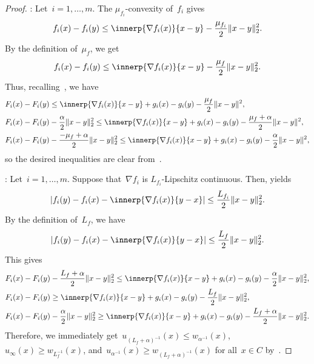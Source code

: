\documentclass[../main]{subfiles}
\begin{document}
\begin{proof}
    :
Let~$i = 1, \dots, m$.
The $\mu_{f_i}$-convexity of~$f_i$ gives
\begin{equation}
    f_i(x) - f_i(y) \le \innerp{\nabla f_i(x)}{x - y} - \frac{\mu_{f_i}}{2} \norm{x - y}_2^2
.\end{equation}
By the definition of~$\mu_f$, we get
\begin{equation}
    f_i(x) - f_i(y) \le \innerp{\nabla f_i(x)}{x - y} - \frac{\mu_f}{2} \norm{x - y}_2^2
.\end{equation}
Thus, recalling~, we have
\begin{align}
    &F_i(x) - F_i(y) \le \innerp{\nabla f_i(x)}{x - y} + g_i(x) - g_i(y) - \frac{\mu_f}{2} \norm{x - y}^2, \\
    &F_i(x) - F_i(y) - \frac{\alpha}{2}\norm{x - y}_2^2 \le \innerp{\nabla f_i(x)}{x - y} + g_i(x) - g_i(y) - \frac{\mu_f + \alpha}{2} \norm{x - y}^2, \\
    &F_i(x) - F_i(y) - \frac{- \mu_f + \alpha}{2}\norm{x - y}_2^2 \le \innerp{\nabla f_i(x)}{x - y} + g_i(x) - g_i(y) - \frac{\alpha}{2} \norm{x - y}^2
,\end{align}
so the desired inequalities are clear from~.

:
Let~$i = 1, \dots, m$.
Suppose that~$\nabla f_i$ is $L_{f_i}$-Lipschitz continuous.
Then,  yields
\begin{equation}
    \abs*{f_i(y) - f_i(x) - \innerp{\nabla f_i(x)}{y - x}} \le \frac{L_{f_i}}{2}\norm{x - y}_2^2.
\end{equation}
By the definition of~$L_f$, we have
\begin{equation}
    \abs*{f_i(y) - f_i(x) - \innerp{\nabla f_i(x)}{y - x}} \le \frac{L_f}{2}\norm{x - y}_2^2.
\end{equation}
This gives
\begin{align}
    &F_i(x) - F_i(y) - \frac{L_f + \alpha}{2} \norm{x - y}_2^2 \le \innerp{\nabla f_i(x)}{x - y} + g_i(x) - g_i(y) - \frac{\alpha}{2} \norm{x - y}_2^2, \\
    &F_i(x) - F_i(y) \ge \innerp{\nabla f_i(x)}{x - y} + g_i(x) - g_i(y) - \frac{L_f}{2} \norm{x - y}_2^2, \\
    &F_i(x) - F_i(y) - \frac{\alpha}{2} \norm{x - y}_2^2 \ge \innerp{\nabla f_i(x)}{x - y} + g_i(x) - g_i(y) - \frac{L_f + \alpha}{2} \norm{x - y}_2^2
.\end{align}
Therefore, we immediately get~$u_{(L_f + \alpha)^{-1}}(x) \le w_{\alpha^{-1}}(x)$,~$u_\infty(x) \ge w_{L_f^{-1}}(x)$, and~$u_{\alpha^{-1}}(x) \ge w_{(L_f + \alpha)^{-1}}(x)$ for all~$x \in C$ by~.
\end{proof}
\end{document}
